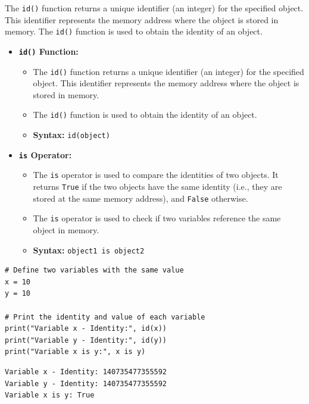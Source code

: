 The \texttt{id()} function returns a unique identifier (an integer) for the specified object. This identifier represents the memory address where the object is stored in memory. The \texttt{id()} function is used to obtain the identity of an object. \\

\begin{itemize}
\item \textbf{\texttt{id()} Function:}
\begin{itemize}
    \item The \texttt{id()} function returns a unique identifier (an integer) for the specified object. This identifier represents the memory address where the object is stored in memory.
    \item The \texttt{id()} function is used to obtain the identity of an object.
    \item \textbf{Syntax:} \texttt{id(object)}    
\end{itemize}

\item \textbf{\texttt{\texttt{is}} Operator:}
\begin{itemize}
    \item The \texttt{is} operator is used to compare the identities of two objects. It returns \texttt{True} if the two objects have the same identity (i.e., they are stored at the same memory address), and \texttt{False} otherwise.
    \item The \texttt{is} operator is used to check if two variables reference the same object in memory.
    \item \textbf{Syntax:} \texttt{object1 is object2}
\end{itemize}
\end{itemize}

\begin{codebox}
\begin{verbatim}
# Define two variables with the same value
x = 10
y = 10

# Print the identity and value of each variable
print("Variable x - Identity:", id(x))
print("Variable y - Identity:", id(y))
print("Variable x is y:", x is y)
\end{verbatim}
\end{codebox}


\begin{verbatim}
Variable x - Identity: 140735477355592
Variable y - Identity: 140735477355592
Variable x is y: True
\end{verbatim}
\newpage
